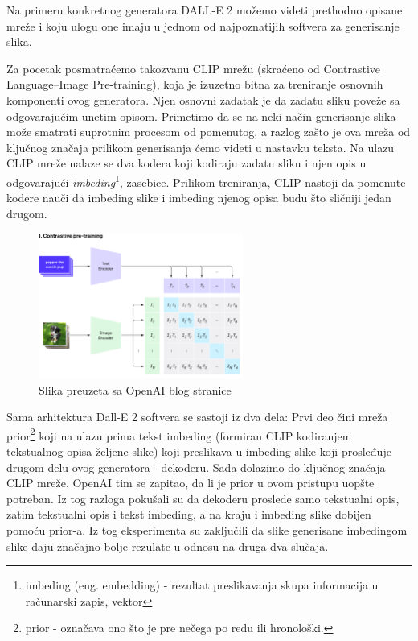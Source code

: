 \documentclass[12pt, letterpaper]{article}
\begin{document}
Na primeru konkretnog generatora DALL-E 2 možemo videti prethodno opisane mreže i koju ulogu one imaju u jednom od najpoznatijih softvera za generisanje slika.

Za pocetak posmatraćemo takozvanu CLIP mrežu (skraćeno od Contrastive Language–Image Pre-training), koja je izuzetno bitna za treniranje osnovnih komponenti ovog generatora. Njen osnovni zadatak je da zadatu sliku poveže sa odgovarajućim unetim opisom. Primetimo da se na neki način generisanje slika može smatrati suprotnim procesom od pomenutog, a razlog zašto je ova mreža od ključnog značaja prilikom generisanja ćemo videti u nastavku teksta. Na ulazu CLIP mreže nalaze se dva kodera koji kodiraju zadatu sliku i njen opis u odgovarajući \textit{imbeding}\footnote{imbeding (eng. embedding) - rezultat preslikavanja skupa informacija u računarski zapis, vektor}, zasebice. Prilikom treniranja, CLIP nastoji da pomenute kodere nauči da imbeding slike i imbeding njenog opisa budu što sličniji jedan drugom.\cite{clip, openai_dali}

\begin{figure}[htp]
\centering
\includegraphics[width=0.6\textwidth]{clip.png}
\caption{Slika preuzeta sa OpenAI blog stranice}
\label{fig: clipslika}
\end{figure}

\pagebreak

Sama arhitektura Dall-E 2 softvera se sastoji iz dva dela: Prvi deo čini mreža prior\footnote{prior - označava ono što je pre nečega po redu ili hronološki.} koji na ulazu prima tekst imbeding (formiran CLIP kodiranjem tekstualnog opisa željene slike) koji preslikava u imbeding slike koji prosleđuje drugom delu ovog generatora - dekoderu. Sada dolazimo do ključnog značaja CLIP mreže. OpenAI tim se zapitao, da li je prior u ovom pristupu uopšte potreban. Iz tog razloga pokušali su da dekoderu proslede samo tekstualni opis, zatim tekstualni opis i tekst imbeding, a na kraju i imbeding slike dobijen pomoću prior-a. Iz tog eksperimenta su zaključili da slike generisane imbedingom slike daju značajno bolje rezulate u odnosu na druga dva slučaja.\cite{openai_dali}
\end{document}
